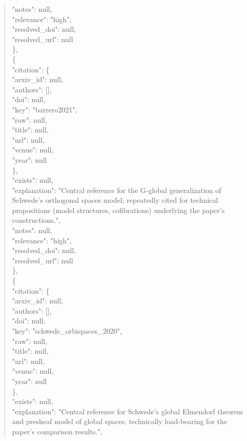 \documentclass[11pt]{article}
\begin{document}
\begin{quote}
      "notes": null,\\
      "relevance": "high",\\
      "resolved\_doi": null,\\
      "resolved\_url": null\\
    \},\\
    \{\\
      "citation": \{\\
        "arxiv\_id": null,\\
        "authors": [],\\
        "doi": null,\\
        "key": "barrero2021",\\
        "raw": null,\\
        "title": null,\\
        "url": null,\\
        "venue": null,\\
        "year": null\\
      \},\\
      "exists": null,\\
      "explanation": "Central reference for the G-global generalization of Schwede's orthogonal spaces model; repeatedly cited for technical propositions (model structures, cofibrations) underlying the paper's constructions.",\\
      "notes": null,\\
      "relevance": "high",\\
      "resolved\_doi": null,\\
      "resolved\_url": null\\
    \},\\
    \{\\
      "citation": \{\\
        "arxiv\_id": null,\\
        "authors": [],\\
        "doi": null,\\
        "key": "schwede\_orbispaces\_2020",\\
        "raw": null,\\
        "title": null,\\
        "url": null,\\
        "venue": null,\\
        "year": null\\
      \},\\
      "exists": null,\\
      "explanation": "Central reference for Schwede's global Elmendorf theorem and presheaf model of global spaces, technically load-bearing for the paper's comparison results.",\\

\end{quote}
\end{document}
